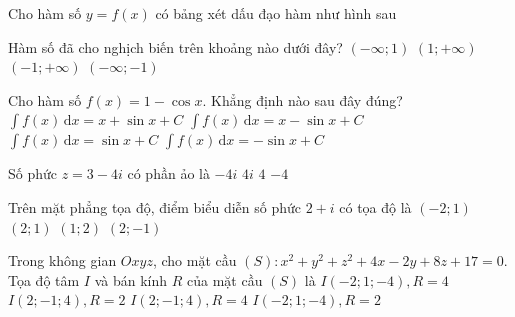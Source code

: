 \begin{ex}%
Cho hàm số $y=f(x)$ có bảng xét dấu đạo hàm như hình sau
\begin{center}
\end{center}
Hàm số đã cho nghịch biến trên khoảng nào dưới đây?
\choice
{$(-\infty ;1)$}
{$(1;+\infty)$}
{$(-1;+\infty)$}
{\True $(-\infty ;-1)$}
\loigiai{
}
\end{ex}



\begin{ex}%
Cho hàm số $f(x)=1-\cos x$. Khẳng định nào sau đây đúng?
\choice
{$\displaystyle\int f(x) \mathrm{\,d}x =x+\sin x+C$}
{\True $\displaystyle\int f(x) \mathrm{\,d}x =x-\sin x+C$}
{$\displaystyle\int f(x)\mathrm{\,d}x =\sin x+C$}
{$\displaystyle\int f(x)\mathrm{\,d}x =-\sin x+C$}
\end{ex}



\begin{ex}%
Số phức $z=3-4i$ có phần ảo là
\choice
{$-4i$}
{$4i$}
{$4$}
{\True $-4$}
\end{ex}


\begin{ex}%
Trên mặt phẳng tọa độ, điểm biểu diễn số phức $2+i$ có tọa độ là
\choice
{$(-2;1)$}
{\True $(2;1)$}
{$(1;2)$}
{$(2;-1)$}
\end{ex}

\begin{ex}%
	Trong không gian $Oxyz$, cho mặt cầu $(S)\colon x^2+y^2+z^2+4x-2y+8z+17=0$. Tọa độ tâm $I$ và bán kính $R$ của mặt cầu $(S)$ là
	\choice
	{$I(-2;1;-4), R=4$ }
	{\True $I(2;-1;4), R=2$}
	{$I(2;-1;4), R=4$}
	{\True$I(-2;1;-4), R=2$}
\end{ex}

